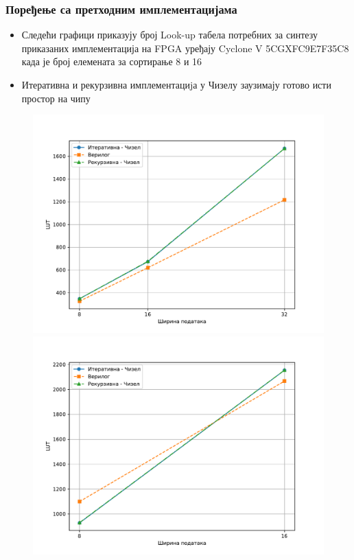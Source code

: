 \begin{frame}%
\frametitle{Поређење са претходним имплементацијама}
 \begin{itemize}
 \item Следећи графици приказују број Look-up табела потребних за синтезу приказаних имплементација на FPGA уређају Cyclone V 5CGXFC9E7F35C8 када је број елемената за сортирање 8 и 16
 \item Итеративна и рекурзивна имплементациjа у Чизелу заузимају готово исти простор на чипу
 \end{itemize}
   \begin{figure}[H]
  \centering
      \includegraphics[scale=0.25]{slike/sorter_impl_LUTcomparison8.pdf}
      \includegraphics[scale=0.25]{slike/sorter_impl_LUTcomparison16.pdf}
 \end{figure}
\end{frame}

